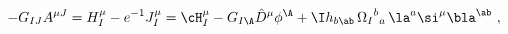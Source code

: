 \begin{equation} \label{sol_A_local}
  - G_{IJ} A^{\mu J} = H^\mu_I - e^{-1} J^\mu_I = \cH^\mu_I - G_{I\A}
  \hat{D}^\mu \phi^\A + \I h_{b\ab}\, {\Omega_I}^b{}_a\, \la^a \si^\mu
  \bla^\ab\ ,
 \end{equation}

